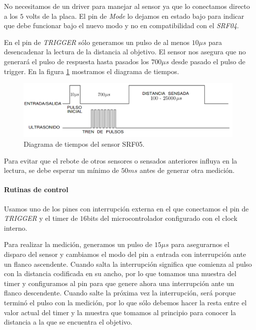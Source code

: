 No necesitamos de un driver para manejar al sensor ya que lo conectamos directo a los $5$ volts de la placa.
El pin de \emph{Mode} lo dejamos en estado bajo para indicar que debe funcionar bajo el nuevo modo y no en compatibilidad con el \emph{SRF04}.

En el pin de \emph{TRIGGER} s\'olo generamos un pulso de al menos $10\mu s$ para desencadenar la lectura de la distancia al objetivo.
El sensor nos asegura que no generar\'a el pulso de respuesta hasta pasados los $700\mu s$ desde pasado el pulso de trigger.
En la figura \ref{hF_srf05_pulse} mostramos el diagrama de tiempos.

\begin{figure}[h]
	\centering
	\includegraphics[scale=0.25]{figuras/srf05_pulse.png}
	\caption{Diagrama de tiempos del sensor SRF05.}
	\label{hF_srf05_pulse}
\end{figure}

Para evitar que el rebote de otros sensores o sensados anteriores influya en la lectura, se debe esperar un m\'inimo de $50ms$ antes de
generar otra medici\'on.

\paragraph{Rutinas de control}
\label{h_sensado_ultrasonido_rutinas}

Usamos uno de los pines con interrupci\'on externa en el que conectamos el pin de \emph{TRIGGER} y el timer de $16$bits del microcontrolador
configurado con el clock interno.

Para realizar la medici\'on, generamos un pulso de $15\mu s$ para asegurarnos el disparo del sensor y cambiamos el modo del pin a entrada con
interrupci\'on ante un flanco ascendente.
Cuando salta la interrupci\'on significa que comienza al pulso con la distancia codificada en su ancho, por lo que tomamos una muestra del
timer y configuramos al pin para que genere ahora una interrupci\'on ante un flanco descendente.
Cuando salte la pr\'oxima vez la interrupci\'on, ser\'a porque termin\'o el pulso con la medici\'on, por lo que s\'olo debemos hacer la resta
entre el valor actual del timer y la muestra que tomamos al principio para conocer la distancia a la que se encuentra el objetivo.

